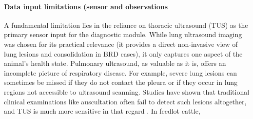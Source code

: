 \paragraph{Data input limitations (sensor and observations} A fundamental limitation lies in the reliance on thoracic ultrasound (TUS) as the primary sensor input for the diagnostic module. While lung ultrasound imaging was chosen for its practical relevance (it provides a direct non-invasive view of lung lesions and consolidation in BRD cases), it only captures one aspect of the animal’s health state. Pulmonary ultrasound, as valuable as it is, offers an incomplete picture of respiratory disease. For example, severe lung lesions can sometimes be missed if they do not contact the pleura or if they occur in lung regions not accessible to ultrasound scanning. Studies have shown that traditional clinical examinations like auscultation often fail to detect such lesions altogether, and TUS is much more sensitive in that regard \cite{buczinski_comparison_2014}. In feedlot cattle, 

